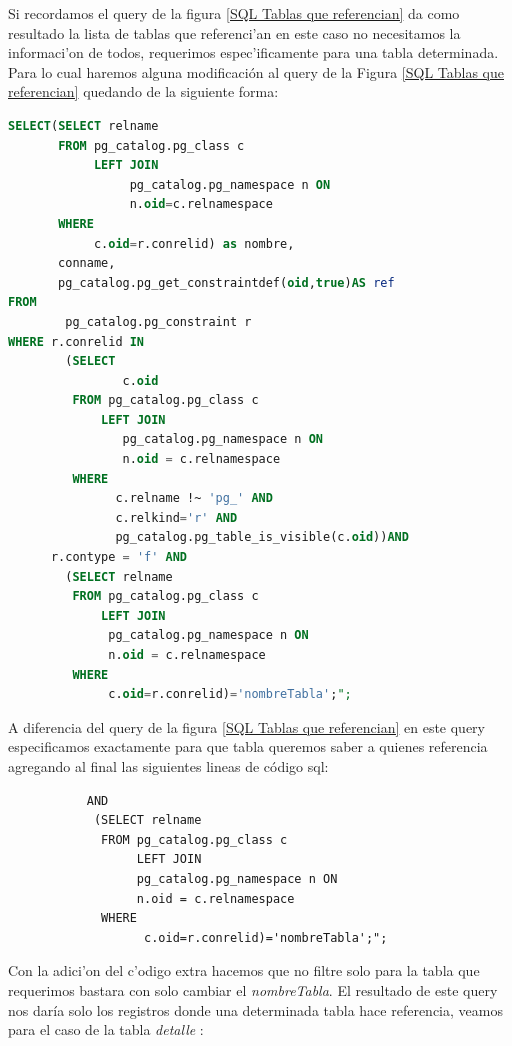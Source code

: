 Si recordamos el query de la figura \ref{SQL Tablas que referencian} da como resultado la lista de tablas que referenci'an en este caso no necesitamos la informaci'on de todos, requerimos espec'ificamente para una tabla determinada. Para lo cual haremos alguna modificaci\'on al query de la Figura \ref{SQL Tablas que referencian} quedando de la siguiente forma:

\begin{lstlisting}[caption={Query para detalle referencias para una tabla},label={muestra detalle tabla por tabla},language=sql]
SELECT(SELECT relname
       FROM pg_catalog.pg_class c 
            LEFT JOIN 
                 pg_catalog.pg_namespace n ON 
                 n.oid=c.relnamespace
       WHERE
            c.oid=r.conrelid) as nombre,
       conname,
       pg_catalog.pg_get_constraintdef(oid,true)AS ref 
FROM
        pg_catalog.pg_constraint r 
WHERE r.conrelid IN
        (SELECT 
                c.oid 
         FROM pg_catalog.pg_class c 
             LEFT JOIN
                pg_catalog.pg_namespace n ON 
                n.oid = c.relnamespace 
         WHERE 
               c.relname !~ 'pg_' AND 
               c.relkind='r' AND 
               pg_catalog.pg_table_is_visible(c.oid))AND
      r.contype = 'f' AND 
        (SELECT relname 
         FROM pg_catalog.pg_class c 
             LEFT JOIN
              pg_catalog.pg_namespace n ON
              n.oid = c.relnamespace 
         WHERE
              c.oid=r.conrelid)='nombreTabla';";
\end{lstlisting}
A diferencia del query de la figura \ref{SQL Tablas que referencian} en este query especificamos exactamente para que tabla queremos saber a quienes referencia agregando al final las siguientes lineas de c\'odigo sql:

\lstset{language=sql,breaklines=true}
\label{muestra detalle tabla por tabla plus}
\begin{lstlisting}
           AND 
            (SELECT relname 
             FROM pg_catalog.pg_class c 
                  LEFT JOIN
                  pg_catalog.pg_namespace n ON
                  n.oid = c.relnamespace 
             WHERE
                   c.oid=r.conrelid)='nombreTabla';";
\end{lstlisting}
Con la adici'on del c'odigo extra hacemos que no filtre solo para la tabla que requerimos bastara con solo cambiar el \textit{nombreTabla}.
El resultado de este query nos dar\'ia solo los registros donde una determinada tabla hace referencia, veamos para el caso de la tabla \textit{detalle} :

